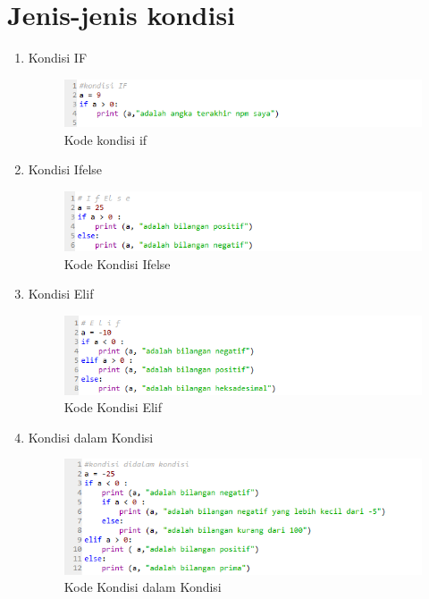 \section{Jenis-jenis kondisi}
\begin{enumerate}
    \item Kondisi IF
        \begin{figure}[!htbp]
        \centering
        \includegraphics[width=15cm]{figures/if.PNG}
        \caption{Kode kondisi if}
    \end{figure}
    \item Kondisi Ifelse
        \begin{figure}[!htbp]
        \centering
        \includegraphics[width=15cm]{figures/ifelse.PNG}
        \caption{Kode Kondisi Ifelse}
    \end{figure}
    \newpage
    \item Kondisi Elif
        \begin{figure}[!htbp]
        \centering
        \includegraphics[width=15cm]{figures/elif.PNG}
        \caption{Kode Kondisi Elif}
    \end{figure}
    \item Kondisi dalam Kondisi
        \begin{figure}[!htbp]
        \centering
        \includegraphics[width=15cm]{figures/kondisidalamkondisi.PNG}
        \caption{Kode Kondisi dalam Kondisi}
    \end{figure}
\end{enumerate}
\newpage
